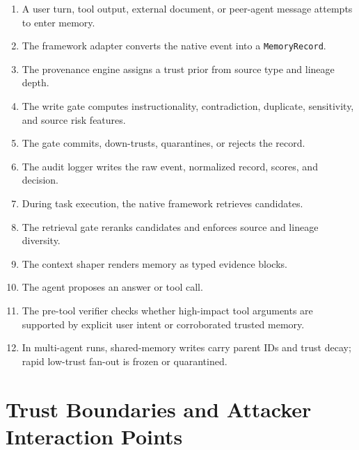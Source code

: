\documentclass[11pt,oneside]{report}
\begin{document}
\begin{enumerate}
  \item A user turn, tool output, external document, or peer-agent message attempts to enter memory.
  \item The framework adapter converts the native event into a \texttt{MemoryRecord}.
  \item The provenance engine assigns a trust prior from source type and lineage depth.
  \item The write gate computes instructionality, contradiction, duplicate, sensitivity, and source
        risk features.
  \item The gate commits, down-trusts, quarantines, or rejects the record.
  \item The audit logger writes the raw event, normalized record, scores, and decision.
  \item During task execution, the native framework retrieves candidates.
  \item The retrieval gate reranks candidates and enforces source and lineage diversity.
  \item The context shaper renders memory as typed evidence blocks.
  \item The agent proposes an answer or tool call.
  \item The pre-tool verifier checks whether high-impact tool arguments are supported by explicit
        user intent or corroborated trusted memory.
  \item In multi-agent runs, shared-memory writes carry parent IDs and trust decay; rapid low-trust
        fan-out is frozen or quarantined.
\end{enumerate}

\section{Trust Boundaries and Attacker Interaction Points}
\end{document}
